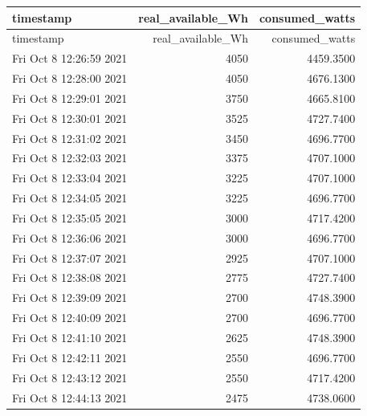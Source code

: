 \begin{longtable}{|l|r|r|}\label{tab:data_v-e HPWH}

               timestamp &  real\_available\_Wh &  consumed\_watts \\ 
\hline
\endfirsthead

               timestamp &  real\_available\_Wh &  consumed\_watts

\endhead

\multicolumn{3}{r}{{Continued on next page}} \\

\endfoot

\endlastfoot
Fri Oct  8 12:26:59 2021 &               4050 &       4459.3500 \\ \hline
Fri Oct  8 12:28:00 2021 &               4050 &       4676.1300 \\ \hline
Fri Oct  8 12:29:01 2021 &               3750 &       4665.8100 \\ \hline
Fri Oct  8 12:30:01 2021 &               3525 &       4727.7400 \\ \hline
Fri Oct  8 12:31:02 2021 &               3450 &       4696.7700 \\ \hline
Fri Oct  8 12:32:03 2021 &               3375 &       4707.1000 \\ \hline
Fri Oct  8 12:33:04 2021 &               3225 &       4707.1000 \\ \hline
Fri Oct  8 12:34:05 2021 &               3225 &       4696.7700 \\ \hline
Fri Oct  8 12:35:05 2021 &               3000 &       4717.4200 \\ \hline
Fri Oct  8 12:36:06 2021 &               3000 &       4696.7700 \\ \hline
Fri Oct  8 12:37:07 2021 &               2925 &       4707.1000 \\ \hline
Fri Oct  8 12:38:08 2021 &               2775 &       4727.7400 \\ \hline
Fri Oct  8 12:39:09 2021 &               2700 &       4748.3900 \\ \hline
Fri Oct  8 12:40:09 2021 &               2700 &       4696.7700 \\ \hline
Fri Oct  8 12:41:10 2021 &               2625 &       4748.3900 \\ \hline
Fri Oct  8 12:42:11 2021 &               2550 &       4696.7700 \\ \hline
Fri Oct  8 12:43:12 2021 &               2550 &       4717.4200 \\ \hline
Fri Oct  8 12:44:13 2021 &               2475 &       4738.0600 \\ \hline

\end{longtable}
